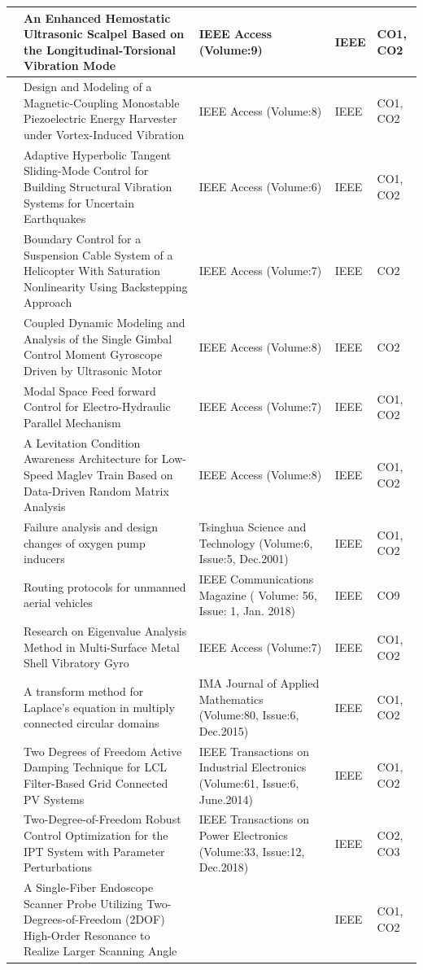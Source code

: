 \documentclass[11pt,paper=a4,answers]{exam}
\begin{document}
\begin{flushleft}
\begin{longtable}{|>{\centering\arraybackslash}p{1.4cm}  |  >{\raggedright\arraybackslash}p{6cm} |>{\centering\arraybackslash}p{3.75cm}|>{\centering\arraybackslash}p{2cm} |>{\centering\arraybackslash}p{2cm} |}
11&An Enhanced Hemostatic Ultrasonic Scalpel Based on the Longitudinal-Torsional Vibration Mode&IEEE Access (Volume:9)&IEEE&CO1, CO2\\\hline
12&Design and Modeling of a Magnetic-Coupling Monostable Piezoelectric Energy Harvester under Vortex-Induced Vibration&IEEE Access (Volume:8)&IEEE&CO1, CO2\\\hline
13&Adaptive Hyperbolic Tangent Sliding-Mode Control for Building Structural Vibration Systems for Uncertain Earthquakes&IEEE Access (Volume:6)&IEEE&CO1, CO2\\\hline
14&Boundary Control for a Suspension Cable System of a Helicopter With Saturation Nonlinearity Using Backstepping Approach&IEEE Access (Volume:7)&IEEE&CO2\\\hline
15&Coupled Dynamic Modeling and Analysis of the Single Gimbal Control Moment Gyroscope Driven by Ultrasonic Motor&IEEE Access (Volume:8)&IEEE&CO2\\\hline
16&Modal Space Feed forward Control for Electro-Hydraulic Parallel Mechanism&IEEE Access (Volume:7)& IEEE&CO1,  CO2\\\hline
17&A Levitation Condition Awareness Architecture for Low-Speed Maglev Train Based on Data-Driven Random Matrix Analysis&IEEE Access (Volume:8)&IEEE&CO1, CO2\\\hline
18&Failure analysis and design changes of oxygen pump inducers&Tsinghua Science and Technology (Volume:6, Issue:5, Dec.2001)&IEEE&CO1, CO2\\\hline
19&Routing protocols for unmanned aerial vehicles&IEEE Communications Magazine ( Volume: 56, Issue: 1, Jan. 2018) & IEEE& CO9\\\hline
20&Research on Eigenvalue Analysis Method in Multi-Surface Metal Shell Vibratory Gyro&IEEE Access (Volume:7)&IEEE&CO1, CO2\\\hline
21&A transform method for Laplace's equation in multiply connected circular domains&IMA Journal of Applied Mathematics (Volume:80, Issue:6, Dec.2015)&IEEE&CO1, CO2\\\hline
22&Two Degrees of Freedom Active Damping Technique for LCL Filter-Based Grid Connected PV Systems&IEEE Transactions on Industrial Electronics (Volume:61, Issue:6, June.2014)&IEEE&CO1, CO2\\\hline
23&Two-Degree-of-Freedom Robust Control Optimization for the IPT System with Parameter Perturbations&IEEE Transactions on Power Electronics (Volume:33, Issue:12, Dec.2018)&IEEE&CO2, CO3\\\hline
24&A Single-Fiber Endoscope Scanner Probe Utilizing Two-Degrees-of-Freedom (2DOF) High-Order Resonance to Realize Larger Scanning Angle&&IEEE&CO1, CO2\\\hline

\end{longtable}
\end{flushleft}
\end{document}

